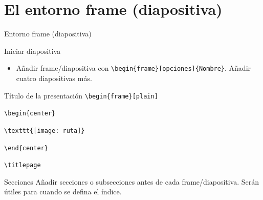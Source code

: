 \documentclass[aspectratio=169, 10pt]{beamer}
\begin{document}
\section{El entorno frame (diapositiva)}        
\begin{frame}[fragile]{Entorno frame (diapositiva)}
    \begin{block}{Iniciar diapositiva} \pause
        \begin{itemize} \pause
            \item Añadir frame/diapositiva con \verb|\begin{frame}[opciones]{Nombre}|. Añadir cuatro diapositivas más. \pause
        \end{itemize}
    \end{block}

    \begin{block}{Título de la presentación} \pause
        \verb|\begin{frame}[plain]| \pause
        
        \verb|\begin{center}| \pause
        
            \verb|\texttt{[image: ruta]}| \pause
        
        \verb|\end{center}| \pause
        
        \verb|\titlepage| 
        
    \end{block}

    \begin{block}{Secciones} \pause
        Añadir secciones o subsecciones antes de cada frame/diapositiva. Serán útiles para cuando se defina el índice.
    \end{block}
    
\end{frame}
\end{document}
